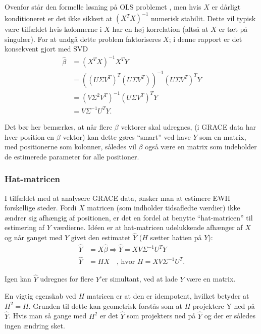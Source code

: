 Ovenfor står den formelle løsning på OLS problemet \cite[s.~12]{statistical-learning}, men hvis $X$ er dårligt konditioneret er det ikke sikkert at $(X^T X)^{-1}$ numerisk stabilit.
Dette vil typisk være tilfældet hvis kolonnerne i $X$ har en høj korrelation (altså at $X$ er tæt på singulær). 
For at undgå dette problem faktoriseres $X$; i denne rapport er det konsekvent gjort med SVD
\begin{equation}
\begin{split}
\hat{\beta} &= (X^T X)^{-1} X^T Y \\
&= \left( \left(U \Sigma V^T\right)^T \left(U \Sigma V^T\right) \right)^{-1} \left(U \Sigma V^T \right)^T Y \\
&= \left( V \Sigma^2 V^T \right)^{-1} \left(U \Sigma V^T \right)^T Y \\
&= V \Sigma^{-1} U^T Y.
\end{split}
\end{equation}

Det bør her bemærkes, at når flere $\beta$ vektorer skal udregnes, (i GRACE data har hver position en $\beta$ vektor) kan dette gøres ``smart'' ved have $Y$ som en matrix,
med positionerne som kolonner, således vil $\beta$ også være en matrix som indeholder de estimerede parameter for alle positioner.

\subsubsection{Hat-matricen}
I tilfældet med at analysere GRACE data, ønsker man at estimere EWH forskellige steder.
Fordi $X$ matricen (som indholder tidsafledte værdier) ikke ændrer sig afhængig af positionen, er det en fordel at benytte ``hat-matricen'' til estimering af $Y$ værdierne.
Idéen er at hat-matricen udelukkende afhænger af $X$ og når ganget med $Y$ givet den estimatet $\hat{Y}$ ($H$ sætter hatten på $Y$):
\begin{equation}
\begin{split}
\hat{Y} &= X \hat{\beta} \Rightarrow \hat{Y} = X V \Sigma^{-1} U^T Y \\
\hat{Y} &= H X \quad \text{, hvor } H = X V \Sigma^{-1} U^T.
\end{split}
\end{equation}

Igen kan $\hat{Y}$ udregnes for flere $Y$'er simultant, ved at lade $Y$ være en matrix.

En vigtig egenskab ved $H$ matricen er at den er idempotent, hvilket betyder at $H^2 = H$.
Grunden til dette kan geometrisk forstås som at $H$ projektere Y ned på $\hat{Y}$.
Hvis man så gange med $H^2$ er det $\hat{Y}$ som projekters ned på $\hat{Y}$ og der er således ingen ændring sket.

